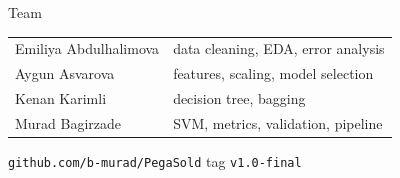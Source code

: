 \documentclass[aspectratio=169,11pt]{beamer}
\begin{document}
\begin{frame}{Team}
\centering
\begin{tabular}{ll}\toprule
Emiliya Abdulhalimova & data cleaning, EDA, error analysis\\
Aygun Asvarova & features, scaling, model selection\\
Kenan Karimli & decision tree, bagging\\
Murad Bagirzade & SVM, metrics, validation, pipeline\\\bottomrule
\end{tabular}

\vspace{1.2em}
\texttt{github.com/b-murad/PegaSold} \quad tag \texttt{v1.0-final}
\end{frame}
\end{document}
